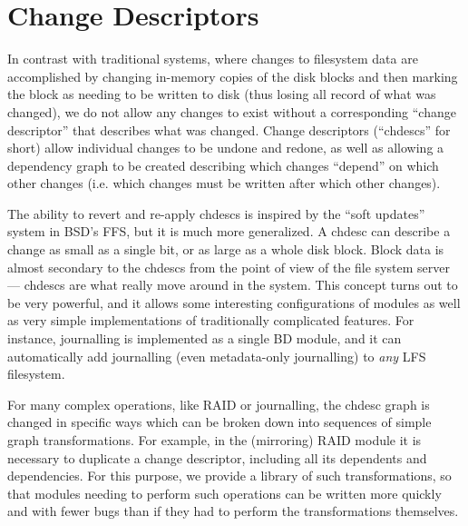 \section{Change Descriptors}
\label{sec:chdescs}

In contrast with traditional systems, where changes to filesystem data are
accomplished by changing in-memory copies of the disk blocks and then marking
the block as needing to be written to disk (thus losing all record of what was
changed), we do not allow any changes to exist without a corresponding ``change
descriptor'' that describes what was changed. Change descriptors (``chdescs''
for short) allow individual changes to be undone and redone, as well as allowing
a dependency graph to be created describing which changes ``depend'' on which
other changes (i.e. which changes must be written after which other changes).

The ability to revert and re-apply chdescs is inspired by the ``soft updates''
system in BSD's FFS, but it is much more generalized. A chdesc can describe a
change as small as a single bit, or as large as a whole disk block. Block data
is almost secondary to the chdescs from the point of view of the file system
server --- chdescs are what really move around in the system. This concept turns
out to be very powerful, and it allows some interesting configurations of
modules as well as very simple implementations of traditionally complicated
features. For instance, journalling is implemented as a single BD module, and it
can automatically add journalling (even metadata-only journalling) to {\it any}
LFS filesystem.

For many complex operations, like RAID or journalling, the chdesc graph is
changed in specific ways which can be broken down into sequences of simple graph
transformations. For example, in the (mirroring) RAID module it is necessary to
duplicate a change descriptor, including all its dependents and dependencies.
For this purpose, we provide a library of such transformations, so that modules
needing to perform such operations can be written more quickly and with fewer
bugs than if they had to perform the transformations themselves.
